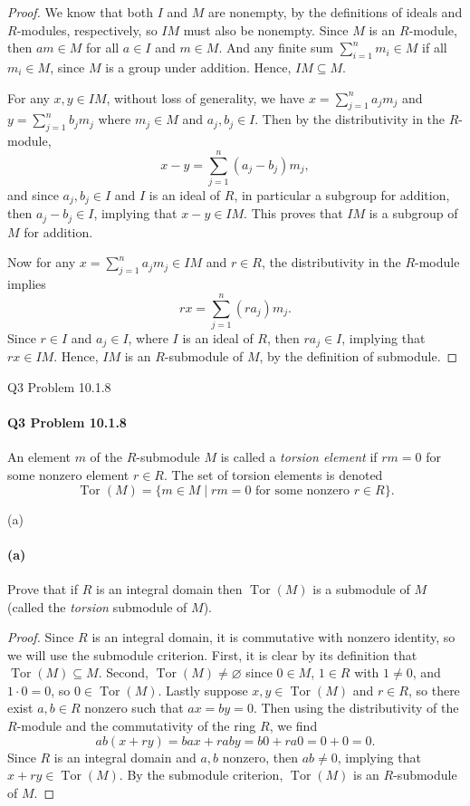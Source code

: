\documentclass[12pt]{article}
\newenvironment{fullbox}{\begin{lrbox}{\savefullbox}\begin{minipage}{\dimexpr\textwidth-2\fboxsep\relax}}{\end{minipage}\end{lrbox}\begin{center}\framebox[\textwidth]{\usebox{\savefullbox}}\end{center}}
\newenvironment{pbox}[1][]{\begin{fullbox}\ifx#1\empty\else\paragraph{#1}\fi}{\end{fullbox}}
\theoremstyle{definition}
\renewcommand{\emptyset}{\varnothing}
\newcommand{\Tor}{\operatorname{Tor}}
\begin{document}
\begin{proof}
    We know that both $I$ and $M$ are nonempty, by the definitions of ideals and $R$-modules, respectively, so $IM$ must also be nonempty. Since $M$ is an $R$-module, then $am \in M$ for all $a \in I$ and $m \in M$. And any finite sum $\sum_{i=1}^{n} m_i \in M$ if all $m_i \in M$, since $M$ is a group under addition. Hence, $IM \subseteq M$.
    
    For any $x, y \in IM$, without loss of generality, we have $x = \sum_{j=1}^{n} a_j m_j$ and $y = \sum_{j=1}^{n} b_j m_j$ where $m_j \in M$ and $a_j, b_j \in I$. Then by the distributivity in the $R$-module,
    \[
        x - y = \sum_{j=1}^{n} (a_j - b_j) m_j,
    \]
    and since $a_j, b_j \in I$ and $I$ is an ideal of $R$, in particular a subgroup for addition, then $a_j - b_j \in I$, implying that $x - y \in IM$. This proves that $IM$ is a subgroup of $M$ for addition.
    
    Now for any $x = \sum_{j=1}^{n} a_j m_j \in IM$ and $r \in R$, the distributivity in the $R$-module implies
    \[
        rx = \sum_{j=1}^{n} (ra_j) m_j.
    \]
    Since $r \in I$ and $a_j \in I$, where $I$ is an ideal of $R$, then $ra_j \in I$, implying that $rx \in IM$. Hence, $IM$ is an $R$-submodule of $M$, by the definition of submodule.
    
\end{proof}




\begin{pbox}[Q3 Problem 10.1.8]
    An element $m$ of the $R$-submodule $M$ is called a \textit{torsion element} if $rm = 0$ for some nonzero element $r \in R$. The set of torsion elements is denoted
    \[
        \Tor(M) = \{m \in M \mid rm = 0 \text{ for some nonzero } r \in R\}.
    \]
\end{pbox}


\begin{pbox}[(a)]
    Prove that if $R$ is an integral domain then $\Tor(M)$ is a submodule of $M$ (called the \textit{torsion} submodule of $M$).
\end{pbox}

\begin{proof}
    Since $R$ is an integral domain, it is commutative with nonzero identity, so we will use the submodule criterion. First, it is clear by its definition that $\Tor(M) \subseteq M$. Second, $\Tor(M) \ne \emptyset$ since $0 \in M$, $1 \in R$ with $1 \ne 0$, and $1 \cdot 0 = 0$, so $0 \in \Tor(M)$. Lastly suppose $x, y \in \Tor(M)$ and $r \in R$, so there exist $a, b \in R$ nonzero such that $ax = by = 0$. Then using the distributivity of the $R$-module and the commutativity of the ring $R$, we find
    \[
        ab(x + ry)
            = bax + raby
            = b0 + ra0
            = 0 + 0
            = 0.
    \]
    Since $R$ is an integral domain and $a, b$ nonzero, then $ab \ne 0$, implying that $x + ry \in \Tor(M)$. By the submodule criterion, $\Tor(M)$ is an $R$-submodule of $M$.
    
\end{proof}
\end{document}
